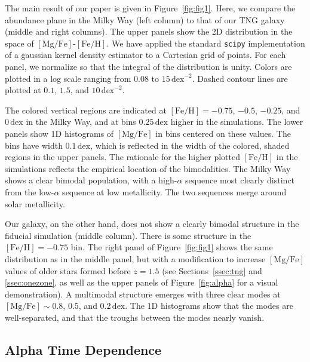 \documentclass[twocolumn,linenumbers]{aastex631}
\newcommand{\FeH}{\ensuremath{[\textrm{Fe}/\textrm{H}]}}
\newcommand{\MgFe}{\ensuremath{[\textrm{Mg}/\textrm{Fe}]}}
\newcommand{\dex}{\ensuremath{\textrm{dex}}}
\begin{document}
The main result of our paper is given in Figure~\ref{fig:fig1}. Here, we compare the abundance plane in the Milky Way (left column) to that of our TNG galaxy (middle and right columns). The upper panels show the 2D distribution in the space of \MgFe{}-\FeH{}. We have applied the standard \texttt{scipy} implementation of a gaussian kernel density estimator to a Cartesian grid of points. For each panel, we normalize so that the integral of the distribution is unity. Colors are plotted in a log scale ranging from $0.08$ to $15\,\dex^{-2}$. Dashed contour lines are plotted at $0.1$, $1.5$, and $10\,\dex^{-2}$.

The colored vertical regions are indicated at $\FeH=-0.75$, $-0.5$, $-0.25$, and $0\,\dex$ in the Milky Way, and at bins $0.25\,\dex$ higher in the simulations. The lower panels show 1D histograms of \MgFe{} in bins centered on these values. The bins have width $0.1\,\dex$, which is reflected in the width of the colored, shaded regions in the upper panels. The rationale for the higher plotted \FeH{} in the simulations reflects the empirical location of the bimodalities. The Milky Way shows a clear bimodal population, with a high-$\alpha$ sequence most clearly distinct from the low-$\alpha$ sequence at low metallicity. The two sequences merge around solar metallicity.

Our galaxy, on the other hand, does not show a clearly bimodal structure in the fiducial simulation (middle column). There is some structure in the $\FeH=-0.75$ bin. The right panel of Figure~\ref{fig:fig1} shows the same distribution as in the middle panel, but with a modification to increase \MgFe{} values of older stars formed before $z=1.5$ (see Sections~\ref{ssec:tng} and \ref{ssec:onezone}, as well as the upper panels of Figure~\ref{fig:alpha} for a visual demonstration). A multimodal structure emerges with three clear modes at $\MgFe\sim0.8$, $0.5$, and $0.2\,\dex$. The 1D histograms show that the modes are well-separated, and that the troughs between the modes nearly vanish.

\subsection{Alpha Time Dependence}\label{ssec:alpha_time}
\end{document}
